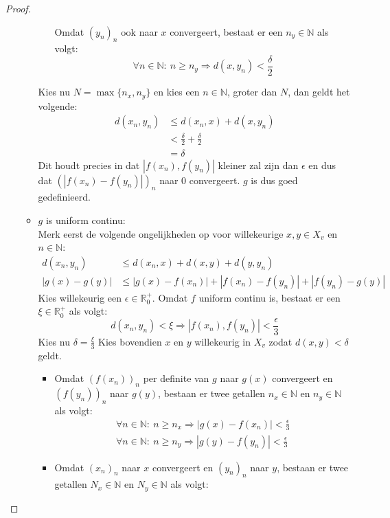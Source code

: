 \documentclass[main.tex]{subfiles}
\begin{document}
\begin{st}
\begin{proof}
\begin{itemize}
\begin{itemize}
\begin{itemize}
          Omdat $(y_{n})_{n}$ ook naar $x$ convergeert, bestaat er een $n_{y}\in\mathbb{N}$ als volgt:
          \[ \forall n\in\mathbb{N}:\ n \ge n_{y} \Rightarrow d(x,y_{n}) < \frac{\delta}{2} \]
        \end{itemize}
        Kies nu $N = \max\{ n_{x}, n_{y}\}$ en kies een $n\in\mathbb{N}$, groter dan $N$, dan geldt het volgende:
        \begin{align*}
          d(x_{n},y_{n})
          &\le d(x_{n},x) + d(x,y_{n})\\
          &< \frac{\delta}{2} + \frac{\delta}{2}\\
          &= \delta
        \end{align*}
        Dit houdt precies in dat $|f(x_{n}),f(y_{n})|$ kleiner zal zijn dan $\epsilon$ en dus dat $\left(|f(x_{n})-f(y_{n})|\right)_{n}$ naar $0$ convergeert.
        $g$ is dus goed gedefinieerd.
      \item $g$ is uniform continu:\\
        Merk eerst de volgende ongelijkheden op voor willekeurige $x,y\in X_{v}$ en $n\in\mathbb{N}$:
        \begin{align*}
          d(x_{n},y_{n}) &\le d(x_{n},x) + d(x,y) + d(y,y_{n})\\
          |g(x)-g(y)| &\le |g(x)-f(x_{n})| + |f(x_{n})-f(y_{n})| + |f(y_{n})-g(y)|
        \end{align*}
        Kies willekeurig een $\epsilon\in\mathbb{R}_{0}^{+}$.
        Omdat $f$ uniform continu is, bestaat er een $\xi\in\mathbb{R}_{0}^{+}$ als volgt:
          \[ d(x_{n},y_{n}) < \xi \Rightarrow |f(x_{n}),f(y_{n})| < \frac{\epsilon}{3} \]
        Kies nu $\delta = \frac{\xi}{3}$
        Kies bovendien $x$ en $y$ willekeurig in $X_{v}$ zodat $d(x,y)< \delta$ geldt.
        \begin{itemize}
        \item 
          Omdat $(f(x_{n}))_{n}$ per definite van $g$ naar $g(x)$ convergeert en $(f(y_{n}))_{n}$ naar $g(y)$, bestaan er twee getallen $n_{x}\in\mathbb{N}$ en $n_{y}\in\mathbb{N}$ als volgt:
          \begin{align*}
            \forall n\in\mathbb{N}:\ n\ge n_{x}\Rightarrow |g(x)-f(x_{n})| < \frac{\epsilon}{3}\\
            \forall n\in\mathbb{N}:\ n\ge n_{y}\Rightarrow |g(y)-f(y_{n})| < \frac{\epsilon}{3}
          \end{align*}
        \item Omdat $(x_{n})_{n}$ naar $x$ convergeert en $(y_{n})_{n}$ naar $y$, bestaan er twee getallen $N_{x}\in\mathbb{N}$ en $N_{y}\in\mathbb{N}$ als volgt:

\end{itemize}
\end{itemize}
\end{itemize}
\end{proof}
\end{st}
\end{document}
